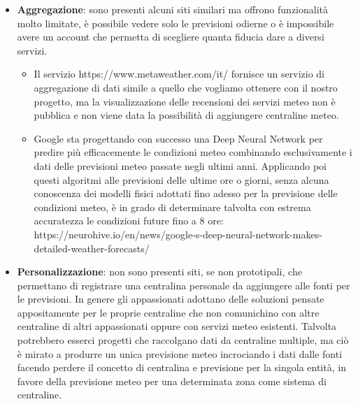 \begin{itemize}

    \item \textbf{Aggregazione}: sono presenti alcuni siti similari ma offrono funzionalità molto limitate, è possibile vedere solo le previsioni odierne o è impossibile avere un account che permetta di scegliere quanta fiducia dare a diversi servizi.
    
    \begin{itemize}
    
        \item Il servizio https://www.metaweather.com/it/ fornisce un servizio di aggregazione di dati simile a quello che vogliamo ottenere con il nostro progetto, ma la visualizzazione delle recensioni dei servizi meteo non è pubblica e non viene data la possibilità di aggiungere centraline meteo.
        
        \item Google sta progettando con successo una Deep Neural Network per predire più efficacemente le condizioni meteo combinando esclusivamente i dati delle previsioni meteo passate negli ultimi anni. Applicando poi questi algoritmi alle previsioni delle ultime ore o giorni, senza alcuna conoscenza dei modelli fisici adottati fino adesso per la previsione delle condizioni meteo, è in grado di determinare talvolta con estrema accuratezza le condizioni future fino a 8 ore: https://neurohive.io/en/news/google-s-deep-neural-network-makes-detailed-weather-forecasts/
        
    \end{itemize}
    
    \item \textbf{Personalizzazione}: non sono presenti siti, se non prototipali, che permettano di registrare una centralina personale da aggiungere alle fonti per le previsioni. In genere gli appassionati adottano delle soluzioni pensate appositamente per le proprie centraline che non comunichino con altre centraline di altri appassionati oppure con servizi meteo esistenti. Talvolta potrebbero esserci progetti che raccolgano dati da centraline multiple, ma ciò è mirato a produrre un unica previsione meteo incrociando i dati dalle fonti facendo perdere il concetto di centralina e previsione per la singola entità, in favore della previsione meteo per una determinata zona come sistema di centraline.
    
\end{itemize}
 

